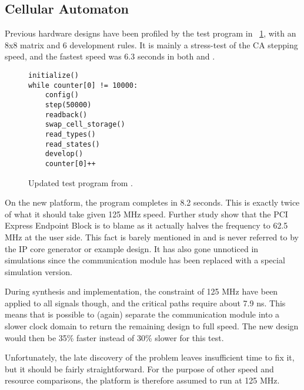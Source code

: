 
\subsection{Cellular Automaton}

Previous hardware designs have been profiled by the test program in \figurename~\ref{fig:test-program}, with an 8x8 matrix and 6 development rules.
It is mainly a stress-test of the CA stepping speed, and the fastest speed was 6.3 seconds in both \cite{djupdal2003sblock} and \cite{stovneng2014sblock}.

\begin{figure}[!ht]
\begin{lstlisting}[xleftmargin=0.34\textwidth]
initialize()
while counter[0] != 10000:
    config()
    step(50000)
    readback()
    swap_cell_storage()
    read_types()
    read_states()
    develop()
    counter[0]++
\end{lstlisting}
\caption[Test program] {
    Updated test program from \cite{djupdal2003sblock}.
}
\label{fig:test-program}
\end{figure}

On the new platform, the program completes in 8.2 seconds.
This is exactly twice of what it should take given 125 MHz speed.
Further study show that the PCI Express Endpoint Block is to blame as it actually halves the frequency to 62.5 MHz at the user side.
This fact is barely mentioned in \cite{ug672} and is never referred to by the IP core generator or example design.
It has also gone unnoticed in simulations since the communication module has been replaced with a special simulation version.

During synthesis and implementation, the constraint of 125 MHz have been applied to all signals though, and the critical paths require about 7.9 ns.
This means that is possible to (again) separate the communication module into a slower clock domain to return the remaining design to full speed.
The new design would then be 35\% faster instead of 30\% slower for this test.

Unfortunately, the late discovery of the problem leaves insufficient time to fix it, but it should be fairly straightforward.
For the purpose of other speed and resource comparisons, the platform is therefore assumed to run at 125 MHz.



